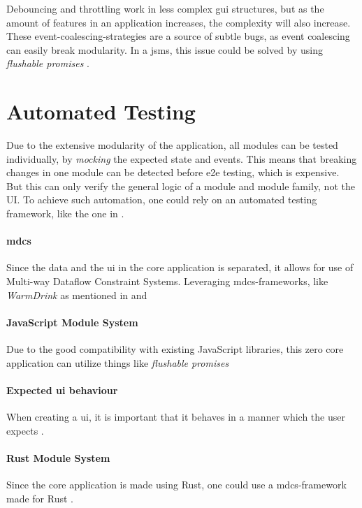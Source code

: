 Debouncing and throttling work in less complex \gls{gui} structures, but as the
amount of features in an application increases, the complexity will also
increase. These event-coalescing-strategies are a source of subtle bugs, as
event coalescing can easily break modularity. In a \gls{jsms}, this issue could
be solved by using \textit{flushable promises} \cite{flush}.


\section{Automated Testing}
Due to the extensive modularity of the application, all modules can be tested
individually, by \textit{mocking} the expected state and events. This means that
breaking changes in one module can be detected before \gls{e2e} testing, which
is expensive.  But this can only verify the general logic of a
module and module family, not the UI. To achieve such automation, one could rely
on an automated testing framework, like the one in \cite{autoUi}.

\paragraph{\gls{mdcs}} Since the data and the \gls{ui}
in the core application is separated, it allows for use of Multi-way Dataflow
Constraint Systems. Leveraging \gls{mdcs}-frameworks, like \textit{WarmDrink} as
mentioned in \cite{warmDrink} and \cite{dslMdcs}

\paragraph{JavaScript Module System} Due to the good compatibility with existing
JavaScript libraries, this zero core application can utilize things like
\textit{flushable promises} \cite{flush}

\paragraph{Expected \gls{ui} behaviour} When creating a \gls{ui}, it is
important that it behaves in a manner which the user expects \cite{leastGui}.

\paragraph{Rust Module System} Since the core application is made using Rust,
one could use a \gls{mdcs}-framework made for Rust \cite{mcdsRust}.

